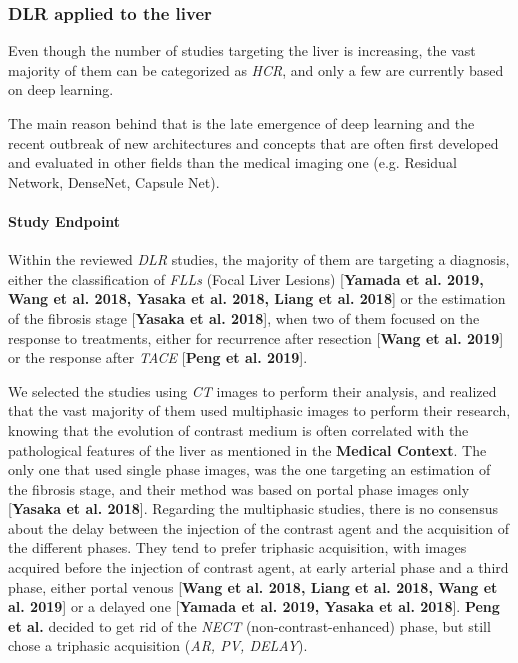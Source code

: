 \documentclass[]{article}
\let\oldparagraph\paragraph
\renewcommand{\paragraph}[1]{\oldparagraph{#1}\mbox{}}
\begin{document}
\subsubsection{DLR applied to the liver}\label{dlr-applied-to-the-liver}

Even though the number of studies targeting the liver is increasing, the
vast majority of them can be categorized as \emph{HCR}, and only a few
are currently based on deep learning.

The main reason behind that is the late emergence of deep learning and
the recent outbreak of new architectures and concepts that are often
first developed and evaluated in other fields than the medical imaging
one (e.g. Residual Network, DenseNet, Capsule Net).

\paragraph{Study Endpoint}\label{study-endpoint}

Within the reviewed \emph{DLR} studies, the majority of them are
targeting a diagnosis, either the classification of \emph{FLLs} (Focal
Liver Lesions) {[}\textbf{Yamada et al. 2019, Wang et al. 2018, Yasaka
et al. 2018, Liang et al. 2018}{]} or the estimation of the fibrosis
stage {[}\textbf{Yasaka et al. 2018}{]}, when two of them focused on the
response to treatments, either for recurrence after resection
{[}\textbf{Wang et al. 2019}{]} or the response after \emph{TACE}
{[}\textbf{Peng et al. 2019}{]}.

We selected the studies using \emph{CT} images to perform their
analysis, and realized that the vast majority of them used multiphasic
images to perform their research, knowing that the evolution of contrast
medium is often correlated with the pathological features of the liver
as mentioned in the \textbf{Medical Context}. The only one that used
single phase images, was the one targeting an estimation of the fibrosis
stage, and their method was based on portal phase images only
{[}\textbf{Yasaka et al. 2018}{]}. Regarding the multiphasic studies,
there is no consensus about the delay between the injection of the
contrast agent and the acquisition of the different phases. They tend to
prefer triphasic acquisition, with images acquired before the injection
of contrast agent, at early arterial phase and a third phase, either
portal venous {[}\textbf{Wang et al. 2018, Liang et al. 2018, Wang et
al. 2019}{]} or a delayed one {[}\textbf{Yamada et al. 2019, Yasaka et
al. 2018}{]}. \textbf{Peng et al.} decided to get rid of the \emph{NECT}
(non-contrast-enhanced) phase, but still chose a triphasic acquisition
(\emph{AR, PV, DELAY}).
\end{document}
